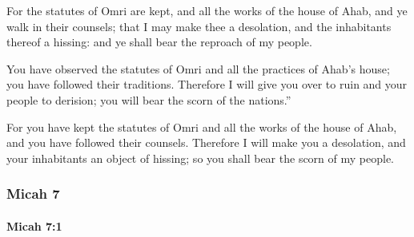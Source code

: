 			\begin{versebox}
					\item[BHS] 
					\item[LXX] 
					\item[ASV] For the statutes of Omri are kept, and all the works of the house of Ahab, and ye walk in their counsels; that I may make thee a desolation, and the inhabitants thereof a hissing: and ye shall bear the reproach of my people.
					\item[NIV] You have observed the statutes of Omri and all the practices of Ahab’s house; you have followed their traditions. Therefore I will give you over to ruin and your people to derision; you will bear the scorn of the nations.”
					\item[NRSV] For you have kept the statutes of Omri and all the works of the house of Ahab, and you have followed their counsels. Therefore I will make you a desolation, and your inhabitants an object of hissing; so you shall bear the scorn of my people.
			\end{versebox}
	\subsubsection{Micah 7} %
		\label{MICAH-7}

		\paragraph{Micah 7:1} %
			\label{MICAH-7-1}

